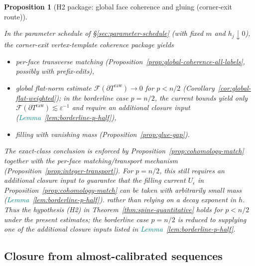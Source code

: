 \documentclass[11pt]{article}
\newcommand{\REVMZ}[1]{\textcolor{teal}{#1}}  %
\numberwithin{equation}{section}  %
\theoremstyle{plain}
\newtheorem{proposition}[theorem]{Proposition}
\theoremstyle{definition}
\theoremstyle{remark}
\begin{document}
\begin{proposition}[H2 package: global face coherence and gluing (corner-exit route)]\label{prop:h2-package}

In the parameter schedule of \S\ref{sec:parameter-schedule} (with fixed $m$ and $h_j\downarrow 0$), the corner-exit vertex-template coherence package yields
\begin{itemize}
\item per-face transverse matching (Proposition~\ref{prop:global-coherence-all-labels}, possibly with prefix-edits),
\item global flat-norm estimate $\mathcal F(\partial T^{\mathrm{raw}})\to 0$ for $p<n/2$ (Corollary~\ref{cor:global-flat-weighted}); in the borderline case $p=n/2$, the current bounds yield only $\mathcal F(\partial T^{\mathrm{raw}})\lesssim \varepsilon^{-1}$ and require an additional closure input (\REVMZ{Lemma~\ref{lem:borderline-p-half}}),
\item filling with vanishing mass (Proposition~\ref{prop:glue-gap}).
\end{itemize}
The exact-class conclusion is enforced by Proposition~\ref{prop:cohomology-match} together with the per-face matching/transport mechanism (Proposition~\ref{prop:integer-transport}). For $p=n/2$, this still requires an additional closure input to guarantee that the filling current $U_\epsilon$ in Proposition~\ref{prop:cohomology-match} can be taken with arbitrarily small mass (\REVMZ{Lemma~\ref{lem:borderline-p-half}}).
rather than relying on a decay exponent in $h$.
Thus the hypothesis \textnormal{(H2)} in Theorem~\ref{thm:spine-quantitative} holds for $p<n/2$ under the present estimates; the borderline case $p=n/2$ is reduced to supplying one of the additional closure inputs listed in \REVMZ{Lemma~\ref{lem:borderline-p-half}}.
\end{proposition}



\subsection*{Closure from almost-calibrated sequences}
\end{document}
